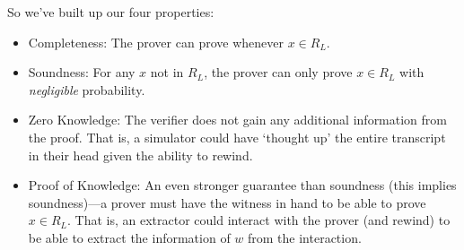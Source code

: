 So we've built up our four properties:
\begin{itemize}
    \item Completeness: The prover can prove whenever $x\in R_L$.
    \item Soundness: For any $x$ not in $R_L$, the prover can only prove $x\in R_L$ with \emph{negligible} probability.
    \item Zero Knowledge: The verifier does not gain any additional information from the proof. That is, a simulator could have `thought up' the entire transcript in their head given the ability to rewind.
    \item Proof of Knowledge: An even stronger guarantee than soundness (this implies soundness)---a prover must have the witness in hand to be able to prove $x\in R_L$. That is, an extractor could interact with the prover (and rewind) to be able to extract the information of $w$ from the interaction.
\end{itemize}
